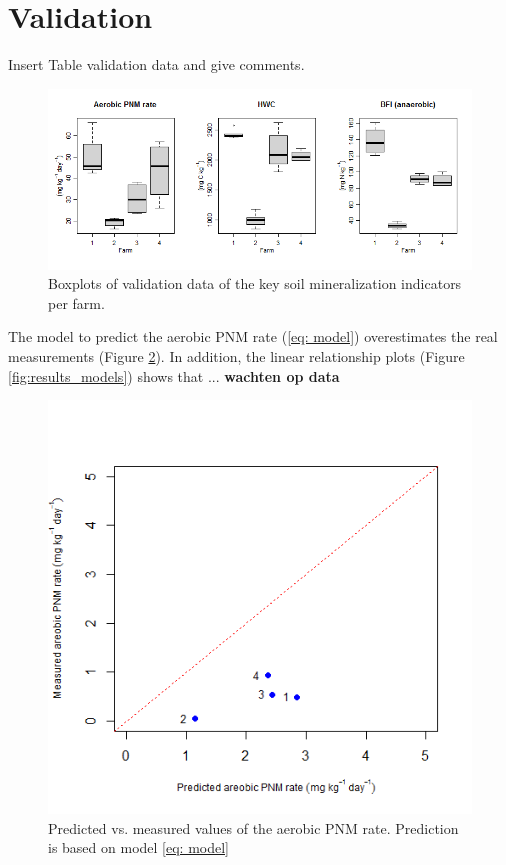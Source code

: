 \documentclass[10pt,twoside,dutch,english]{report}
\begin{document}
\section{Validation}
Insert Table validation data and give comments.
	\begin{figure}[ht] %
		\centering
		\includegraphics[width=1\linewidth]{results_valbox}
		\caption{Boxplots of validation data of the key soil mineralization indicators per farm.}
		\label{fig:results_valbox}
	\end{figure}

The model to predict the aerobic PNM rate (\ref{eq: model}) overestimates the real measurements (Figure \ref{fig:results_pm}). In addition, the linear relationship plots (Figure \ref{fig:results_models}) shows that ... \textbf{wachten op data}  

	\begin{figure}[ht] %
		\includegraphics[width=0.7\linewidth]{results_pm}
		\caption{Predicted vs. measured values of the aerobic PNM rate. Prediction is based on model \ref{eq: model}}
		\label{fig:results_pm}
	\end{figure}
	
\end{document}

